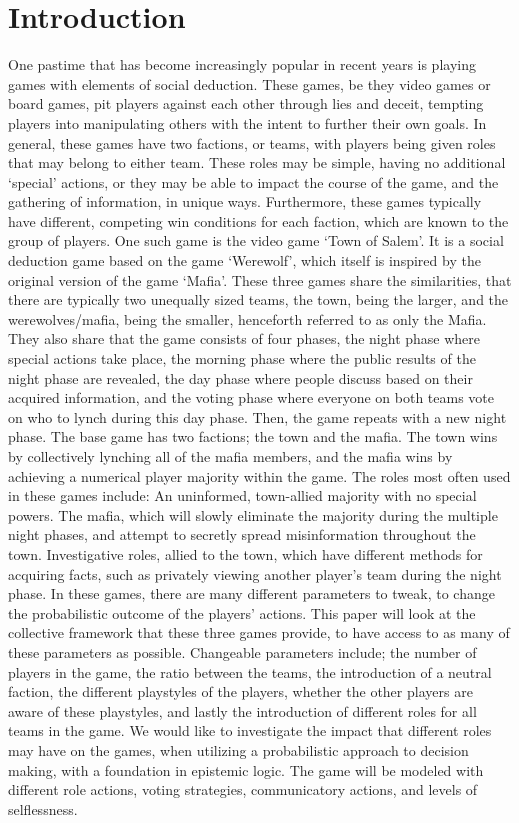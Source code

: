 \section{Introduction}
One pastime that has become increasingly popular in recent years is playing
games with elements of social deduction. These games, be they video games or
board games, pit players against each other through lies and deceit, tempting
players into manipulating others with the intent to further their own goals. In
general, these games have two factions, or teams, with players being given
roles that may belong to either team. These roles may be simple, having no
additional ‘special’ actions, or they may be able to impact the course of the
game, and the gathering of information, in unique ways. Furthermore, these
games typically have different, competing win conditions for each faction,
which are known to the group of players. One such game is the video game ‘Town
of Salem’. It is a social deduction game based on the game ‘Werewolf’, which
itself is inspired by the original version of the game ‘Mafia’. These three
games share the similarities, that there are typically two unequally sized
teams, the town, being the larger, and the werewolves/mafia, being the smaller,
henceforth referred to as only the Mafia. They also share that the game
consists of four phases, the night phase where special actions take place, the
morning phase where the public results of the night phase are revealed, the day
phase where people discuss based on their acquired information, and the voting
phase where everyone on both teams vote on who to lynch during this day phase.
Then, the game repeats with a new night phase. The base game has two factions;
the town and the mafia. The town wins by collectively lynching all of the mafia
members, and the mafia wins by achieving a numerical player majority within the
game. The roles most often used in these games include: An uninformed,
town-allied majority with no special powers. The mafia, which will slowly
eliminate the majority during the multiple night phases, and attempt to
secretly spread misinformation throughout the town. Investigative roles, allied
to the town, which have different methods for acquiring facts, such as
privately viewing another player’s team during the night phase. In these games,
there are many different parameters to tweak, to change the probabilistic
outcome of the players’ actions. This paper will look at the collective
framework that these three games provide, to have access to as many of these
parameters as possible. Changeable parameters include; the number of players in
the game, the ratio between the teams, the introduction of a neutral faction,
the different playstyles of the players, whether the other players are aware of
these playstyles, and lastly the introduction of different roles for all teams
in the game. We would like to investigate the impact that different roles may
have on the games, when utilizing a probabilistic approach to decision making,
with a foundation in epistemic logic. The game will be modeled with different
role actions, voting strategies, communicatory actions, and levels of
selflessness.